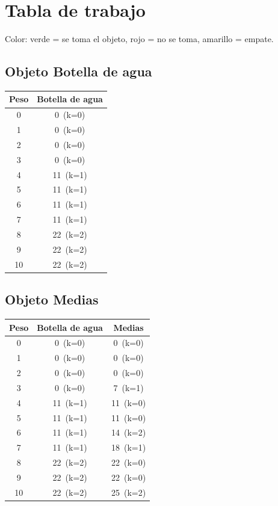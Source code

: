 \documentclass[12pt]{article}
\begin{document}
\section*{Tabla de trabajo}
Color: {\color{green}verde} = se toma el objeto, {\color{red}rojo} = no se toma, {\color{yellow}amarillo} = empate.\\
\begin{landscape}
\subsection*{Objeto Botella de agua}
\begin{longtable}{cc}
\toprule
Peso & Botella de agua \\
\midrule
0 & \cellcolor{red!20}0~(k=0) \\
1 & \cellcolor{red!20}0~(k=0) \\
2 & \cellcolor{red!20}0~(k=0) \\
3 & \cellcolor{red!20}0~(k=0) \\
4 & \cellcolor{green!40}11~(k=1) \\
5 & \cellcolor{green!40}11~(k=1) \\
6 & \cellcolor{green!40}11~(k=1) \\
7 & \cellcolor{green!40}11~(k=1) \\
8 & \cellcolor{green!40}22~(k=2) \\
9 & \cellcolor{green!40}22~(k=2) \\
10 & \cellcolor{green!40}22~(k=2) \\
\bottomrule
\end{longtable}
\end{landscape}
\begin{landscape}
\subsection*{Objeto Medias}
\begin{longtable}{ccc}
\toprule
Peso & Botella de agua & Medias \\
\midrule
0 & \cellcolor{red!20}0~(k=0) & \cellcolor{red!20}0~(k=0) \\
1 & \cellcolor{red!20}0~(k=0) & \cellcolor{red!20}0~(k=0) \\
2 & \cellcolor{red!20}0~(k=0) & \cellcolor{red!20}0~(k=0) \\
3 & \cellcolor{red!20}0~(k=0) & \cellcolor{green!40}7~(k=1) \\
4 & \cellcolor{green!40}11~(k=1) & \cellcolor{red!20}11~(k=0) \\
5 & \cellcolor{green!40}11~(k=1) & \cellcolor{red!20}11~(k=0) \\
6 & \cellcolor{green!40}11~(k=1) & \cellcolor{green!40}14~(k=2) \\
7 & \cellcolor{green!40}11~(k=1) & \cellcolor{green!40}18~(k=1) \\
8 & \cellcolor{green!40}22~(k=2) & \cellcolor{red!20}22~(k=0) \\
9 & \cellcolor{green!40}22~(k=2) & \cellcolor{red!20}22~(k=0) \\
10 & \cellcolor{green!40}22~(k=2) & \cellcolor{green!40}25~(k=2) \\
\bottomrule
\end{longtable}
\end{landscape}
\end{document}
